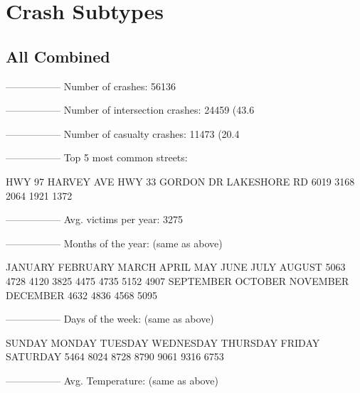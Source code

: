 \documentclass[11pt, a4paper]{article}
\begin{document}
\pagebreak
\section{Crash Subtypes}

\subsection{All Combined}

\begin{Schunk}
\begin{Soutput}
-----------------
Number of crashes: 56136
\end{Soutput}
\begin{Soutput}
-----------------
Number of intersection crashes: 24459 (43.6%
\end{Soutput}
\begin{Soutput}
-----------------
Number of casualty crashes: 11473 (20.4%
\end{Soutput}
\begin{Soutput}
-----------------
Top 5 most common streets:
\end{Soutput}
\begin{Soutput}
      HWY 97   HARVEY AVE       HWY 33    GORDON DR LAKESHORE RD 
        6019         3168         2064         1921         1372 
\end{Soutput}
\begin{Soutput}
-----------------
Avg. victims per year: 3275
\end{Soutput}
\begin{Soutput}
-----------------
Months of the year: (same as above)
\end{Soutput}
\begin{Soutput}
  JANUARY  FEBRUARY     MARCH     APRIL       MAY      JUNE      JULY    AUGUST 
     5063      4728      4120      3825      4475      4735      5152      4907 
SEPTEMBER   OCTOBER  NOVEMBER  DECEMBER 
     4632      4836      4568      5095 
\end{Soutput}
\begin{Soutput}
-----------------
Days of the week: (same as above)
\end{Soutput}
\begin{Soutput}
   SUNDAY    MONDAY   TUESDAY WEDNESDAY  THURSDAY    FRIDAY  SATURDAY 
     5464      8024      8728      8790      9061      9316      6753 
\end{Soutput}
\begin{Soutput}
-----------------
Avg. Temperature: (same as above)

\end{Soutput}
\end{Schunk}
\end{document}
